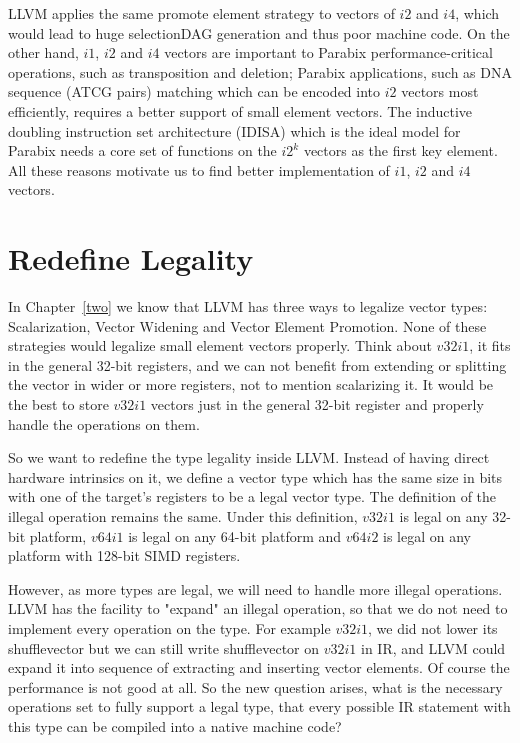 LLVM applies the same promote element strategy to vectors of $i2$ and $i4$, which would lead to huge selectionDAG generation and thus poor machine code. On the other hand, $i1$, $i2$ and $i4$ vectors are important to Parabix performance-critical operations, such as transposition and deletion; Parabix applications, such as DNA sequence (ATCG pairs) matching which can be encoded into $i2$ vectors most efficiently, requires a better support of small element vectors. The inductive doubling instruction set architecture (IDISA) which is the ideal model for Parabix needs a core set of functions on the $i2^k$ vectors as the first key element. All these reasons motivate us to find better implementation of $i1$, $i2$ and $i4$ vectors.

\section{Redefine Legality}

In Chapter~\ref{two} we know that LLVM has three ways to legalize vector types: Scalarization, Vector Widening and Vector Element Promotion. None of these strategies would legalize small element vectors properly. Think about $v32i1$, it fits in the general 32-bit registers, and we can not benefit from extending or splitting the vector in wider or more registers, not to mention scalarizing it. It would be the best to store $v32i1$ vectors just in the general 32-bit register and properly handle the operations on them.

So we want to redefine the type legality inside LLVM\@. Instead of having direct hardware intrinsics on it, we define a vector type which has the same size in bits with one of the target's registers to be a legal vector type. The definition of the illegal operation remains the same. Under this definition, $v32i1$ is legal on any 32-bit platform, $v64i1$ is legal on any 64-bit platform and $v64i2$ is legal on any platform with 128-bit SIMD registers.

However, as more types are legal, we will need to handle more illegal operations. LLVM has the facility to "expand" an illegal operation, so that we do not need to implement every operation on the type. For example $v32i1$, we did not lower its shufflevector but we can still write shufflevector on $v32i1$ in IR, and LLVM could expand it into sequence of extracting and inserting vector elements. Of course the performance is not good at all. So the new question arises, what is the necessary operations set to fully support a legal type, that every possible IR statement with this type can be compiled into a native machine code?

